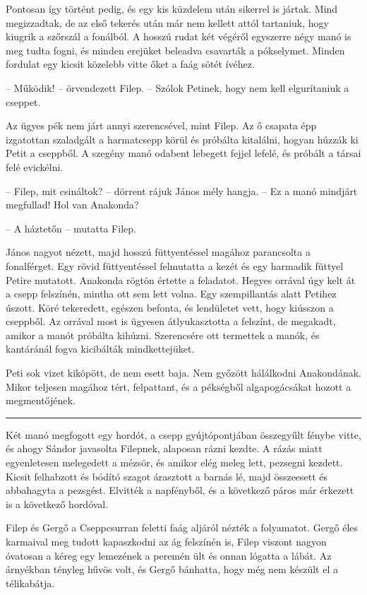 \documentclass[10pt]{memoir}
\renewcommand{\pfbreakdisplay}{\bigskip \ding{166} \bigskip}
\newcommand{\secbreak}{\fancybreak{\pfbreakdisplay}\indent}
\begin{document}
Pontosan így történt pedig, és egy kis küzdelem után sikerrel is jártak. Mind
megizzadtak, de az első tekerés után már nem kellett attól tartaniuk, hogy
kiugrik a szőrszál a fonálból. A hosszú rudat két végéről egyszerre négy manó
is meg tudta fogni, és minden erejüket beleadva csavarták a pókselymet. Minden
fordulat egy kicsit közelebb vitte őket a faág sötét ívéhez.

-- Működik! -- örvendezett Filep. -- Szólok Petinek, hogy nem kell
elgurítaniuk a cseppet.

Az ügyes pék nem járt annyi szerencsével, mint Filep. Az ő csapata épp
izgatottan szaladgált a harmatcsepp körül és próbálta kitalálni, hogyan húzzák
ki Petit a cseppből. A szegény manó odabent lebegett fejjel lefelé, és próbált
a társai felé evickélni.

-- Filep, mit csináltok? -- dörrent rájuk János mély hangja. -- Ez a manó
mindjárt megfullad! Hol van Anakonda?

-- A háztetőn -- mutatta Filep.

János nagyot nézett, majd hosszú füttyentéssel magához parancsolta a
fonalférget. Egy rövid füttyentéssel felmutatta a kezét és egy harmadik füttyel
Petire mutatott. Anakonda rögtön értette a feladatot. Hegyes orrával úgy kelt
át a csepp felszínén, mintha ott sem lett volna. Egy szempillantás alatt
Petihez úszott. Köré tekeredett, egészen befonta, és lendületet vett, hogy
kiússzon a cseppből. Az orrával most is ügyesen átlyukasztotta a felszínt, de
megakadt, amikor a manót próbálta kihúzni. Szerencsére ott termettek a manók,
és kantáránál fogva kicibálták mindkettejüket.

Peti sok vizet kiköpött, de nem esett baja. Nem győzött hálálkodni Anakondának.
Mikor teljesen magához tért, felpattant, és a pékségből algapogácsákat hozott a
megmentőjének.

\secbreak

Két manó megfogott egy hordót, a csepp gyújtópontjában összegyűlt fénybe vitte,
és ahogy Sándor javasolta Filepnek, alaposan rázni kezdte. A rázás miatt
egyenletesen melegedett a mézsör, és amikor elég meleg lett, pezsegni kezdett.
Kicsit felhabzott és bódító szagot árasztott a barnás lé, majd összeesett és
abbahagyta a pezsgést. Elvitték a napfényből, és a következő páros már érkezett
is a következő hordóval.

Filep és Gergő a Cseppcsurran feletti faág aljáról nézték a folyamatot. Gergő
éles karmaival meg tudott kapaszkodni az ág felszínén is, Filep viszont nagyon
óvatosan a kéreg egy lemezének a peremén ült és onnan lógatta a lábát. Az
árnyékban tényleg hűvös volt, és Gergő bánhatta, hogy még nem készült el a
télikabátja.
\end{document}
